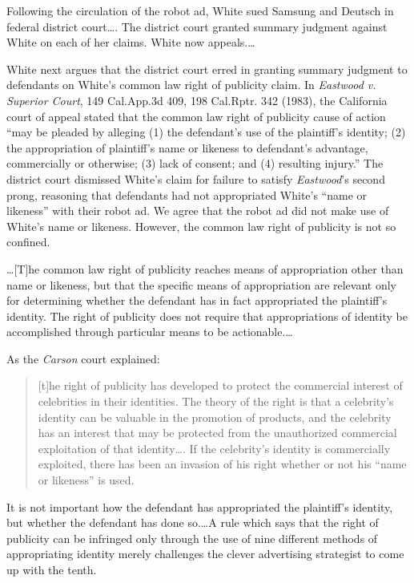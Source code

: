 

Following the circulation of the robot ad, White sued Samsung and Deutsch in
federal district court\dots. The district court granted summary judgment
against White on each of her claims. White now appeals.\dots


White next argues that the district court erred in granting summary judgment to
defendants on White's common law right of publicity claim. In \emph{Eastwood v.
Superior Court}, 149 Cal.App.3d 409, 198 Cal.Rptr. 342 (1983), the California
court of appeal stated that the common law right of publicity cause of action
``may be pleaded by alleging (1) the defendant's use of the plaintiff's
identity; (2) the appropriation of plaintiff's name or likeness to defendant's
advantage, commercially or otherwise; (3) lack of consent; and (4) resulting
injury.'' The district court dismissed White's claim for failure to satisfy
\emph{Eastwood}'s second prong, reasoning that defendants had not appropriated
White's
``name or likeness'' with their robot ad. We agree that the robot ad did not
make use of White's name or likeness. However, the common law right of
publicity is not so confined.

\dots [T]he common law right of publicity reaches means of appropriation other
than name or likeness, but that the specific means of appropriation are
relevant only for determining whether the defendant has in fact appropriated
the plaintiff's identity. The right of publicity does not require that
appropriations of identity be accomplished through particular means to be
actionable.\dots

As the \emph{Carson} court explained:
\begin{quote}
[t]he right of publicity has developed to protect the commercial interest of
celebrities in their identities. The theory of the right is that a celebrity's
identity can be valuable in the promotion of products, and the celebrity has an
interest that may be protected from the unauthorized commercial exploitation of
that identity\dots. If the celebrity's identity is commercially exploited,
there has been an invasion of his right whether or not his ``name or likeness''
is used.
\end{quote}
It is not important how the defendant has appropriated the plaintiff's identity,
but whether the defendant has done so.\dots A rule which says that
the right of publicity can be infringed only through the use of nine different
methods of appropriating identity merely challenges the clever advertising
strategist to come up with the tenth.

